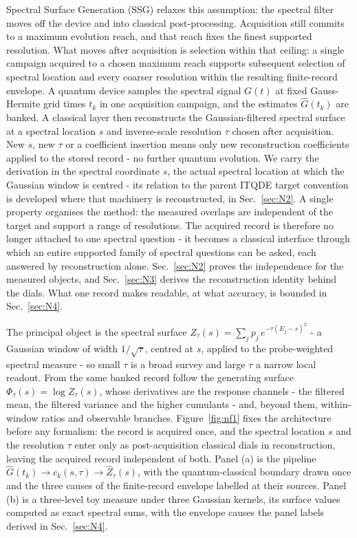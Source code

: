 Spectral Surface Generation (SSG) relaxes this assumption: the spectral filter moves off the device and into classical post-processing. Acquisition still commits to a maximum evolution reach, and that reach fixes the finest supported resolution. What moves after acquisition is selection within that ceiling: a single campaign acquired to a chosen maximum reach supports subsequent selection of spectral location and every coarser resolution within the resulting finite-record envelope. A quantum device samples the spectral signal $G(t)$ at fixed Gauss-Hermite grid times $t_k$ in one acquisition campaign, and the estimates $\hat{G}(t_k)$ are banked. A classical layer then reconstructs the Gaussian-filtered spectral surface at a spectral location $s$ and inverse-scale resolution $\tau$ chosen after acquisition. New $s$, new $\tau$ or a coefficient insertion means only new reconstruction coefficients applied to the stored record - no further quantum evolution. We carry the derivation in the spectral coordinate $s$, the actual spectral location at which the Gaussian window is centred - its relation to the parent ITQDE target convention is developed where that machinery is reconstructed, in Sec.~\ref{sec:N2}. A single property organises the method: the measured overlaps are independent of the target and support a range of resolutions. The acquired record is therefore no longer attached to one spectral question - it becomes a classical interface through which an entire supported family of spectral questions can be asked, each answered by reconstruction alone. Sec.~\ref{sec:N2} proves the independence for the measured objects, and Sec.~\ref{sec:N3} derives the reconstruction identity behind the dials. What one record makes readable, at what accuracy, is bounded in Sec.~\ref{sec:N4}.

The principal object is the spectral surface $Z_\tau(s) = \sum_j p_j\, e^{-\tau (E_j - s)^2}$ - a Gaussian window of width $1/\sqrt{\tau}$, centred at $s$, applied to the probe-weighted spectral measure - so small $\tau$ is a broad survey and large $\tau$ a narrow local readout. From the same banked record follow the generating surface $\Phi_\tau(s) = \log Z_\tau(s)$, whose derivatives are the response channels - the filtered mean, the filtered variance and the higher cumulants - and, beyond them, within-window ratios and observable branches. Figure~\ref{fig:nf1} fixes the architecture before any formalism: the record is acquired once, and the spectral location $s$ and the resolution $\tau$ enter only as post-acquisition classical dials in reconstruction, leaving the acquired record independent of both. Panel (a) is the pipeline $\hat{G}(t_k) \to c_k(s,\tau) \to \hat{Z}_\tau(s)$, with the quantum-classical boundary drawn once and the three causes of the finite-record envelope labelled at their sources. Panel (b) is a three-level toy measure under three Gaussian kernels, its surface values computed as exact spectral sums, with the envelope causes the panel labels derived in Sec.~\ref{sec:N4}.

